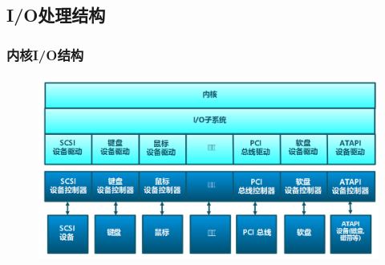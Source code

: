 \subsection{I/O处理结构} %
\begin{frame}[fragile]
    \frametitle{内核I/O结构}
    \begin{figure}
    \includegraphics[width=0.8\linewidth]{figs/os-io-arch.png}
    \end{figure}
\end{frame}

